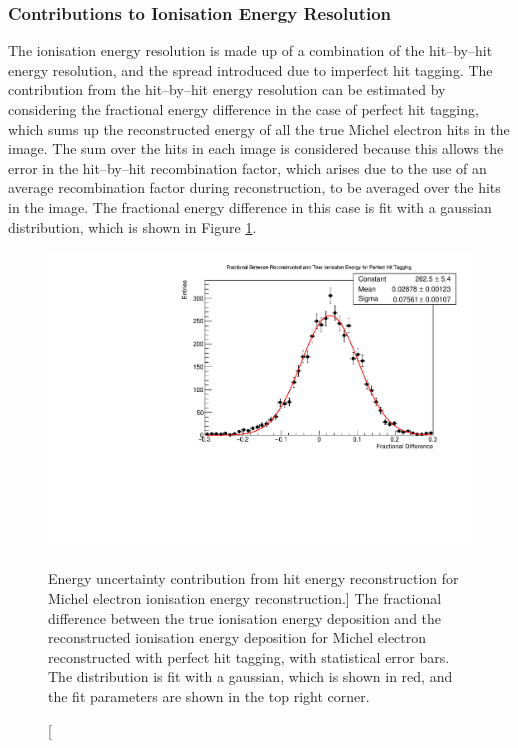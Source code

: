 \subsubsection*{Contributions to Ionisation Energy Resolution}
The ionisation energy resolution is made up of a combination of the hit--by--hit
energy resolution, and the spread introduced due to imperfect hit tagging. The
contribution from the hit--by--hit energy resolution can be estimated by
considering the fractional energy difference in the case of perfect hit tagging,
which sums up the reconstructed energy of all the true Michel electron hits in
the image. The sum over the hits in each image is considered because this
allows the error in the hit--by--hit recombination factor, which arises due to
the use of an average recombination factor during reconstruction, to be 
averaged over the hits in the image. The fractional energy difference in this
case is fit with a gaussian distribution, which is shown in Figure
\ref{fig:michel_hit_res}. 
\begin{figure}
	\centering
	\includegraphics[width=\textwidth]{figures/michel_hit_energy_resolution.pdf}
	\caption
	[Energy uncertainty contribution from hit energy reconstruction for Michel
	electron ionisation energy reconstruction.]
	{The fractional difference between the true ionisation energy deposition and
	the reconstructed ionisation energy deposition for Michel electron
	reconstructed with perfect hit tagging, with statistical error bars. The 
	distribution is fit with a gaussian, which is shown in red, and the fit 
	parameters are shown in the top right corner.}
	\label{fig:michel_hit_res}
\end{figure}

